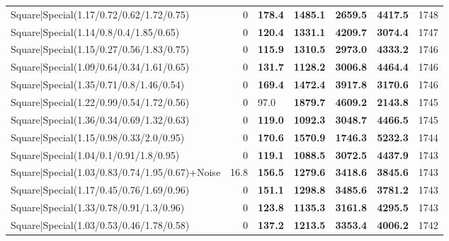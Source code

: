 \begin{tabular}{lrllllr}
 Square|Special(1.17/0.72/0.62/1.72/0.75)                      &             0   & \textbf{178.4} & \textbf{1485.1} & \textbf{2659.5} & \textbf{4417.5} &         1748 \\
 Square|Special(1.14/0.8/0.4/1.85/0.65)                        &             0   & \textbf{120.4} & \textbf{1331.1} & \textbf{4209.7} & \textbf{3074.4} &         1747 \\
 Square|Special(1.15/0.27/0.56/1.83/0.75)                      &             0   & \textbf{115.9} & \textbf{1310.5} & \textbf{2973.0} & \textbf{4333.2} &         1746 \\
 Square|Special(1.09/0.64/0.34/1.61/0.65)                      &             0   & \textbf{131.7} & \textbf{1128.2} & \textbf{3006.8} & \textbf{4464.4} &         1746 \\
 Square|Special(1.35/0.71/0.8/1.46/0.54)                       &             0   & \textbf{169.4} & \textbf{1472.4} & \textbf{3917.8} & \textbf{3170.6} &         1746 \\
 Square|Special(1.22/0.99/0.54/1.72/0.56)                      &             0   & 97.0           & \textbf{1879.7} & \textbf{4609.2} & \textbf{2143.8} &         1745 \\
 Square|Special(1.36/0.34/0.69/1.32/0.63)                      &             0   & \textbf{119.0} & \textbf{1092.3} & \textbf{3048.7} & \textbf{4466.5} &         1745 \\
 Square|Special(1.15/0.98/0.33/2.0/0.95)                       &             0   & \textbf{170.6} & \textbf{1570.9} & \textbf{1746.3} & \textbf{5232.3} &         1744 \\
 Square|Special(1.04/0.1/0.91/1.8/0.95)                        &             0   & \textbf{119.1} & \textbf{1088.5} & \textbf{3072.5} & \textbf{4437.9} &         1743 \\
 Square|Special(1.03/0.83/0.74/1.95/0.67)+Noise                &            16.8 & \textbf{156.5} & \textbf{1279.6} & \textbf{3418.6} & \textbf{3845.6} &         1743 \\
 Square|Special(1.17/0.45/0.76/1.69/0.96)                      &             0   & \textbf{151.1} & \textbf{1298.8} & \textbf{3485.6} & \textbf{3781.2} &         1743 \\
 Square|Special(1.33/0.78/0.91/1.3/0.96)                       &             0   & \textbf{123.8} & \textbf{1135.3} & \textbf{3161.8} & \textbf{4295.5} &         1743 \\
 Square|Special(1.03/0.53/0.46/1.78/0.58)                      &             0   & \textbf{137.2} & \textbf{1213.5} & \textbf{3353.4} & \textbf{4006.2} &         1742 \\

\end{tabular}
